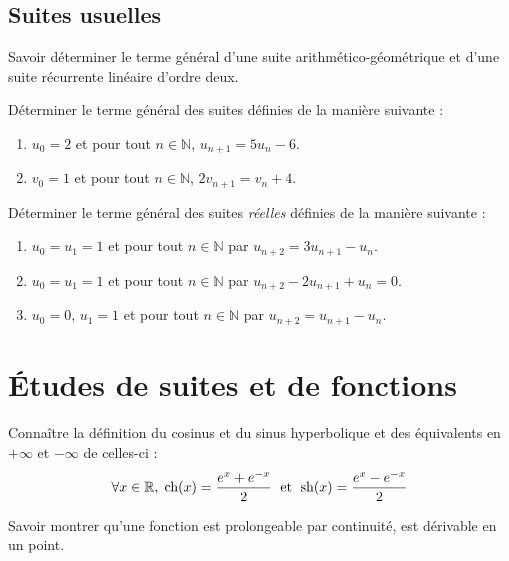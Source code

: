 \documentclass[a4paper,twoside,french,11pt]{VcCours}
\begin{document}
\subsection{Suites usuelles}

\begin{ptc}{}
	Savoir déterminer le terme général d'une suite arithmético-géométrique et d'une suite récurrente linéaire d'ordre deux.
\end{ptc}

\begin{Exercice}{}
  Déterminer le terme général des suites définies de la manière suivante :

  \begin{enumerate}
    \item $u_0=2$ et pour tout $n \in \mathbb{N}$, $u_{n+1} = 5 u_n -6$. 
    \item $v_0=1$ et pour tout $n \in \mathbb{N}$, $2v_{n+1}= v_n+ 4$.
  \end{enumerate}
\end{Exercice} 

\begin{Exercice}{}
  Déterminer le terme général des suites \textit{réelles} définies de la manière suivante :
  \begin{enumerate}
    \item $u_0=u_1=1$ et pour tout $n \in \mathbb{N}$ par $u_{n+2}=3u_{n+1}-u_n$.
    \item $u_0=u_1=1$ et pour tout $n \in \mathbb{N}$ par $u_{n+2}-2u_{n+1}+u_n=0$.
    \item $u_0=0$, $u_1=1$ et pour tout $n \in \mathbb{N}$ par $u_{n+2}=u_{n+1}-u_n$.
  \end{enumerate}
\end{Exercice}

\section{Études de suites et de fonctions}

\begin{ptc}{}
	Connaître la définition du cosinus et du sinus hyperbolique et des équivalents en $+ \infty$ et $- \infty$ de celles-ci :
$$ \forall x \in \mathbb{R}, \; \textrm{ch}(x) = \dfrac{e^x+e^{-x}}{2} \; \hbox{ et } \; \textrm{sh}(x) = \dfrac{e^x-e^{-x}}{2}$$
\end{ptc}

\begin{ptc}{}
	Savoir montrer qu'une fonction est prolongeable par continuité, est dérivable en un point.
\end{ptc}
\end{document}
